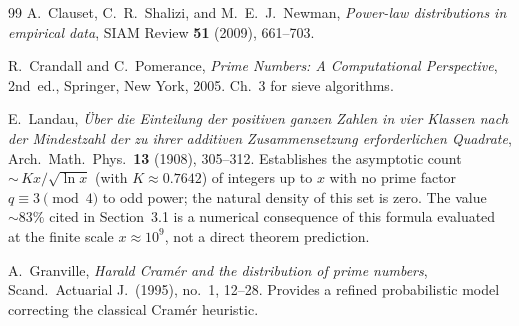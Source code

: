 \documentclass[12pt]{article}
\begin{document}
\begin{thebibliography}{99}
	A.~Clauset, C.~R.~Shalizi, and M.~E.~J.~Newman,
	\textit{Power-law distributions in empirical data},
	SIAM Review \textbf{51} (2009), 661--703.
	
	R.~Crandall and C.~Pomerance,
	\textit{Prime Numbers: A Computational Perspective},
	2nd~ed., Springer, New York, 2005.
	Ch.~3 for sieve algorithms.
	
	E.~Landau,
	\textit{\"Uber die Einteilung der positiven ganzen Zahlen in vier
		Klassen nach der Mindestzahl der zu ihrer additiven Zusammensetzung
		erforderlichen Quadrate},
	Arch.\ Math.\ Phys.\ \textbf{13} (1908), 305--312.
	Establishes the asymptotic count ${\sim}\,Kx/\sqrt{\ln x}$
	(with $K \approx 0.7642$) of integers up to $x$ with no prime factor
	$q \equiv 3 \pmod{4}$ to odd power; the natural density of this
	set is zero.
	The value ${\sim}83\%$ cited in Section~3.1 is a numerical consequence
	of this formula evaluated at the finite scale $x \approx 10^9$,
	not a direct theorem prediction.
	
	A.~Granville,
	\textit{Harald Cram\'er and the distribution of prime numbers},
	Scand.\ Actuarial J.\ (1995), no.~1, 12--28.
	Provides a refined probabilistic model correcting the classical
	Cram\'er heuristic.
	
\end{thebibliography}
\end{document}

